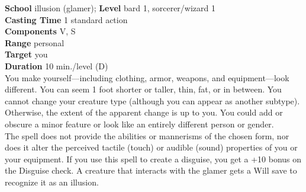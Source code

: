 \textbf{School} illusion (glamer); \textbf{Level} bard 1, sorcerer/wizard 1\\
\textbf{Casting Time} 1 standard action\\
\textbf{Components} V, S\\
\textbf{Range} personal\\
\textbf{Target} you\\
\textbf{Duration} 10 min./level (D)\\
You make yourself—including clothing, armor, weapons, and equipment—look different. You can seem 1 foot shorter or taller, thin, fat, or in between. You cannot change your creature type (although you can appear as another subtype). Otherwise, the extent of the apparent change is up to you. You could add or obscure a minor feature or look like an entirely different person or gender.\\
The spell does not provide the abilities or mannerisms of the chosen form, nor does it alter the perceived tactile (touch) or audible (sound) properties of you or your equipment. If you use this spell to create a disguise, you get a +10 bonus on the Disguise check. A creature that interacts with the glamer gets a Will save to recognize it as an illusion.\\
